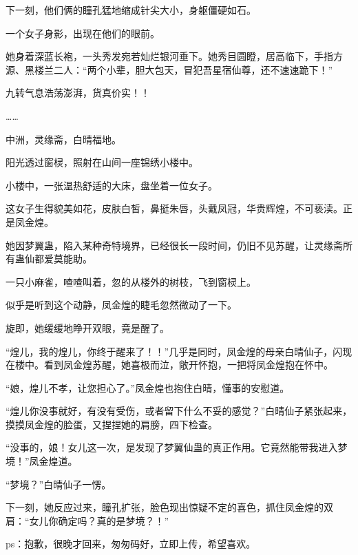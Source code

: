 \begin{this_body}
下一刻，他们俩的瞳孔猛地缩成针尖大小，身躯僵硬如石。

一个女子身影，出现在他们的眼前。

她身着深蓝长袍，一头秀发宛若灿烂银河垂下。她秀目圆瞪，居高临下，手指方源、黑楼兰二人：“两个小辈，胆大包天，冒犯吾星宿仙尊，还不速速跪下！”

九转气息浩荡澎湃，货真价实！！

……

中洲，灵缘斋，白晴福地。

阳光透过窗棂，照射在山间一座锦绣小楼中。

小楼中，一张温热舒适的大床，盘坐着一位女子。

这女子生得貌美如花，皮肤白皙，鼻挺朱唇，头戴凤冠，华贵辉煌，不可亵渎。正是凤金煌。

她因梦翼蛊，陷入某种奇特境界，已经很长一段时间，仍旧不见苏醒，让灵缘斋所有蛊仙都爱莫能助。

一只小麻雀，喳喳叫着，忽的从楼外的树枝，飞到窗棂上。

似乎是听到这个动静，凤金煌的睫毛忽然微动了一下。

旋即，她缓缓地睁开双眼，竟是醒了。

“煌儿，我的煌儿，你终于醒来了！！”几乎是同时，凤金煌的母亲白晴仙子，闪现在楼中。看到凤金煌苏醒，她喜极而泣，敞开怀抱，一把将凤金煌抱在怀中。

“娘，煌儿不孝，让您担心了。”凤金煌也抱住白晴，懂事的安慰道。

“煌儿你没事就好，有没有受伤，或者留下什么不妥的感觉？”白晴仙子紧张起来，摸摸凤金煌的脸蛋，又捏捏她的肩膀，四下检查。

“没事的，娘！女儿这一次，是发现了梦翼仙蛊的真正作用。它竟然能带我进入梦境！”凤金煌道。

“梦境？”白晴仙子一愣。

下一刻，她反应过来，瞳孔扩张，脸色现出惊疑不定的喜色，抓住凤金煌的双肩：“女儿你确定吗？真的是梦境？！”

ps：抱歉，很晚才回来，匆匆码好，立即上传，希望喜欢。

\end{this_body}

